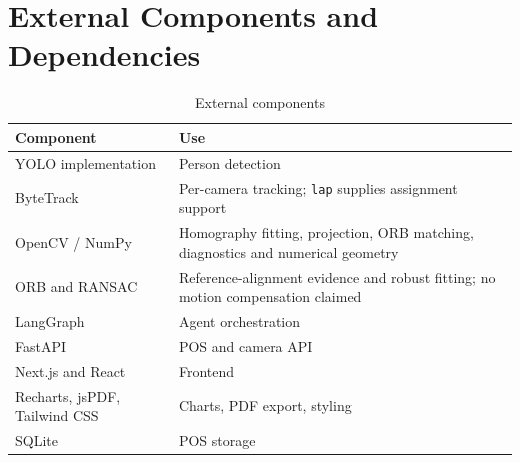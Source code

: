 \section{External Components and Dependencies}
\begin{table}[H]
\centering
\caption{External components}
\begin{tabular}{P{0.25\textwidth}P{0.62\textwidth}}
\toprule
Component & Use\\
\midrule
YOLO implementation \cite{ultralytics} & Person detection\\
ByteTrack \cite{zhang2022bytetrack} & Per-camera tracking; \texttt{lap} supplies assignment support\\
OpenCV / NumPy \cite{opencvHomography} & Homography fitting, projection, ORB matching, diagnostics and numerical geometry\\
ORB \cite{rublee2011orb} and RANSAC \cite{fischler1981ransac} & Reference-alignment evidence and robust fitting; no motion compensation claimed\\
LangGraph \cite{langgraph} & Agent orchestration\\
FastAPI \cite{fastapi} & POS and camera API\\
Next.js and React \cite{nextjs} & Frontend\\
Recharts, jsPDF, Tailwind CSS & Charts, PDF export, styling\\
SQLite & POS storage\\
\bottomrule
\end{tabular}
\end{table}

